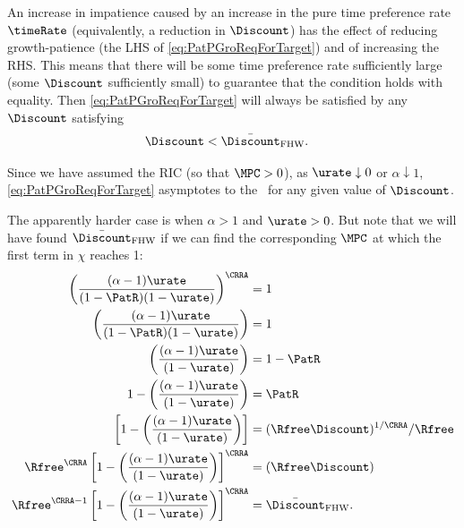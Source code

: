 \documentclass{handout}
\begin{document}
An increase in impatience caused by an increase in the pure time preference rate $\timeRate$ (equivalently, a reduction in $\Discount$) has the effect of reducing growth-patience (the LHS of \eqref{eq:PatPGroReqForTarget}) and of increasing the RHS.  This means that there will be some time preference rate sufficiently large (some $\Discount$ sufficiently small) to guarantee that the condition holds with equality.  Then \eqref{eq:PatPGroReqForTarget} will always be satisfied by any $\Discount$ satisfying \providecommand{\DiscountMaxGICWhenFHWCTBSHolds}{\ensuremath{\bar{\Discount}_{\text{FHW}}}}
\begin{equation}\begin{gathered}\begin{aligned}
  \Discount & <  \DiscountMaxGICWhenFHWCTBSHolds \label{eq:DiscountMaxGICWhenFHWCTBSHolds}
.\end{aligned}\end{gathered}\end{equation}


Since we have assumed the RIC (so that $\MPCU > 0$), as $\urate \downarrow 0$ or $\alpha \downarrow 1$, \eqref{eq:PatPGroReqForTarget} asymptotes to the \GICPGro~for any given value of $\Discount$.  

The apparently harder case is when $\alpha>1$ and $\urate > 0$.  But note that we will have found $\DiscountMaxGICWhenFHWCTBSHolds$ if we can find the corresponding $\MPCU$ at which the first term in $\chi$ reaches 1:
\begin{equation}\begin{gathered}\begin{aligned}
    \left(\frac{(\alpha-1)\urate}{(1-\PatR) (1-\urate)}\right)^{\CRRA} & =  1
\\  \left(\frac{(\alpha-1)\urate}{(1-\PatR) (1-\urate)}\right) & =  1
\\  \left(\frac{(\alpha-1)\urate}{ (1-\urate)}\right) & =  1-\PatR
\\  1-\left(\frac{(\alpha-1)\urate}{ (1-\urate)}\right) & =  \PatR
\\                  \left[1-\left(\frac{(\alpha-1)\urate}{ (1-\urate)}\right)\right] & =  (\Rfree \Discount)^{1/\CRRA}/\Rfree
\\  \Rfree^{\CRRA}  \left[1-\left(\frac{(\alpha-1)\urate}{ (1-\urate)}\right)\right]^{\CRRA} & =  (\Rfree \Discount)
\\  \Rfree^{\CRRA-1}\left[1-\left(\frac{(\alpha-1)\urate}{ (1-\urate)}\right)\right]^{\CRRA} & =  \DiscountMaxGICWhenFHWCTBSHolds \label{eq:DiscountMaxGICWhenFHWCTBSHoldsAndGICPGroIsExactlySatisfied}
.\end{aligned}\end{gathered}\end{equation}
\end{document}
